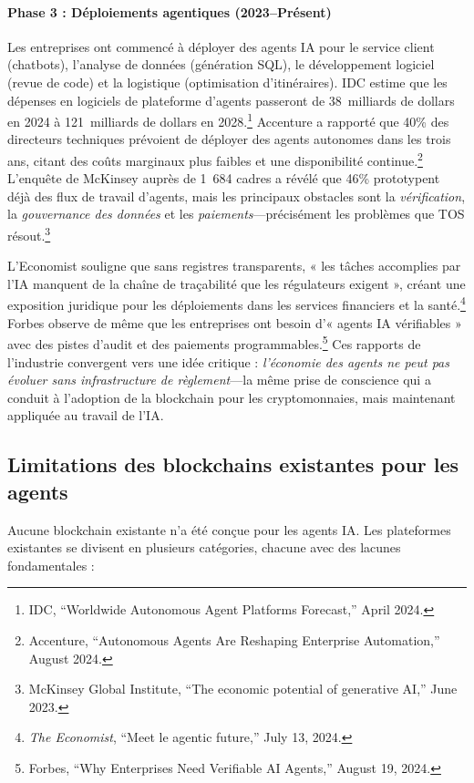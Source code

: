 \documentclass[11pt]{article}
\begin{document}
\paragraph{Phase 3 : Déploiements agentiques (2023--Présent)} Les entreprises ont commencé à déployer des agents IA pour le service client (chatbots), l'analyse de données (génération SQL), le développement logiciel (revue de code) et la logistique (optimisation d'itinéraires). IDC estime que les dépenses en logiciels de plateforme d'agents passeront de 38~milliards de dollars en 2024 à 121~milliards de dollars en 2028.\footnote{IDC, ``Worldwide Autonomous Agent Platforms Forecast,'' April 2024.} Accenture a rapporté que 40\% des directeurs techniques prévoient de déployer des agents autonomes dans les trois ans, citant des coûts marginaux plus faibles et une disponibilité continue.\footnote{Accenture, ``Autonomous Agents Are Reshaping Enterprise Automation,'' August 2024.} L'enquête de McKinsey auprès de 1~684 cadres a révélé que 46\% prototypent déjà des flux de travail d'agents, mais les principaux obstacles sont la \emph{vérification}, la \emph{gouvernance des données} et les \emph{paiements}---précisément les problèmes que TOS résout.\footnote{McKinsey Global Institute, ``The economic potential of generative AI,'' June 2023.}

L'Economist souligne que sans registres transparents, « les tâches accomplies par l'IA manquent de la chaîne de traçabilité que les régulateurs exigent », créant une exposition juridique pour les déploiements dans les services financiers et la santé.\footnote{\emph{The Economist}, ``Meet le agentic future,'' July 13, 2024.} Forbes observe de même que les entreprises ont besoin d'« agents IA vérifiables » avec des pistes d'audit et des paiements programmables.\footnote{Forbes, ``Why Enterprises Need Verifiable AI Agents,'' August 19, 2024.} Ces rapports de l'industrie convergent vers une idée critique : \emph{l'économie des agents ne peut pas évoluer sans infrastructure de règlement}---la même prise de conscience qui a conduit à l'adoption de la blockchain pour les cryptomonnaies, mais maintenant appliquée au travail de l'IA.

\subsection{Limitations des blockchains existantes pour les agents}
Aucune blockchain existante n'a été conçue pour les agents IA. Les plateformes existantes se divisent en plusieurs catégories, chacune avec des lacunes fondamentales :
\end{document}
